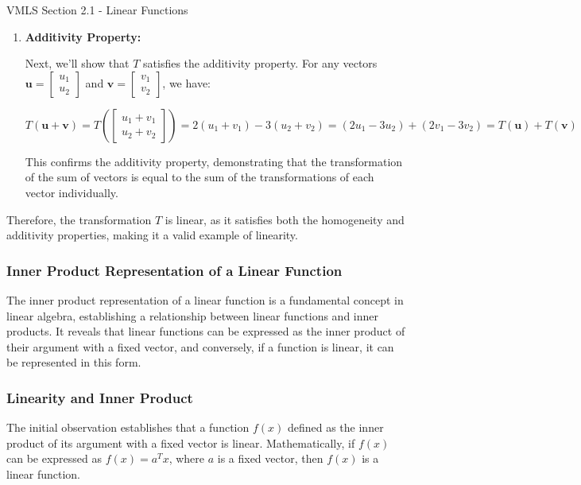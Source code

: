 \begin{notes}{VMLS Section 2.1 - Linear Functions}
\begin{Highlight}
\begin{enumerate}
            \item \textbf{Additivity Property:}
            
            Next, we'll show that \(T\) satisfies the additivity property. For any vectors \(\mathbf{u} = \begin{bmatrix} u_1 \\ u_2 \end{bmatrix}\) and \(\mathbf{v} = \begin{bmatrix} v_1 \\ v_2 \end{bmatrix}\), we have:
            
            \[
            T(\mathbf{u} + \mathbf{v}) = T\left(\begin{bmatrix} u_1 + v_1 \\ u_2 + v_2 \end{bmatrix}\right) = 2(u_1 + v_1) - 3(u_2 + v_2) = (2u_1 - 3u_2) + (2v_1 - 3v_2) = T(\mathbf{u}) + T(\mathbf{v})
            \]
            
            This confirms the additivity property, demonstrating that the transformation of the sum of vectors is equal to the sum of the transformations of each vector individually.
        \end{enumerate}
        Therefore, the transformation \(T\) is linear, as it satisfies both the homogeneity and additivity properties, making it a valid example of linearity.
    \end{Highlight}

    \subsubsection*{Inner Product Representation of a Linear Function}
    
    The inner product representation of a linear function is a fundamental concept in linear algebra, establishing a relationship between linear functions and inner products. It reveals that linear functions can be expressed 
    as the inner product of their argument with a fixed vector, and conversely, if a function is linear, it can be represented in this form.
    
    \subsubsection*{Linearity and Inner Product}
    
    The initial observation establishes that a function \(f(x)\) defined as the inner product of its argument with a fixed vector is linear. Mathematically, if \(f(x)\) can be expressed as \(f(x) = a^T x\), where \(a\) is a 
    fixed vector, then \(f(x)\) is a linear function.
    

\end{notes}
